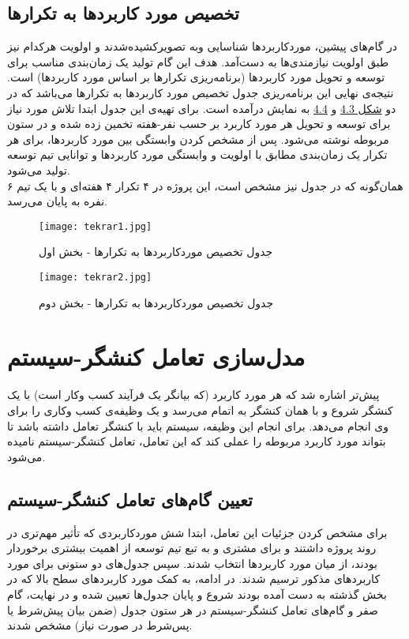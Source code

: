 \documentclass{report}
\begin{document}
\subsection{تخصیص مورد کاربردها به تکرارها}
در گام‌های پیشین، ﻣﻮردﮐﺎرﺑﺮدﻫﺎ ﺷﻨﺎﺳﺎﯾﯽ وﺑﻪ ﺗﺼﻮﯾﺮﻛﺸﯿﺪهﺷﺪند و اوﻟﻮﯾﺖ هرکدام نیز طبق اوﻟﻮﯾﺖ ﻧﯿﺎزﻣﻨﺪی‌ها ﺑﻪ دﺳﺖآﻣﺪ. هدف این گام تولید یک زمان‌بندی مناسب برای توسعه و تحویل مورد کاربردها (برنامه‌ریزی تکرارها بر اساس مورد کاربردها) است. نتیجه‌ی نهایی این برنامه‌ریزی جدول تخصیص مورد کاربردها به تکرارها می‌باشد که در دو 
 \hyperlink{three}{شکل 4.3}
و
 \hyperlink{four}{4.4}
 به نمایش درآمده است. برای تهیه‌ی این جدول ابتدا تلاش مورد نیاز برای توسعه و تحویل هر مورد کاربرد بر حسب نفر-هفته تخمین زده شده و در ستون مربوطه نوشته می‌شود. پس از مشخص کردن وابستگی بین مورد کاربردها، برای هر تکرار یک زمان‌بندی مطابق با اولویت و وابستگی مورد کاربردها و توانایی تیم توسعه تولید می‌شود.\\
همان‌گونه که در جدول نیز مشخص است، این پروژه در ۴ تکرار ۴ هفته‌ای و با یک تیم ۶ نفره به پایان می‌رسد.
\hypertarget{three}{
\begin{figure}[!h]
\texttt{[image: tekrar1.jpg]}
\caption{جدول تخصیص موردکاربردها به تکرارها - بخش اول}
\end{figure}}
\clearpage
\hypertarget{four}{
\begin{figure}[!h]
\texttt{[image: tekrar2.jpg]}
\caption{جدول تخصیص موردکاربردها به تکرارها - بخش دوم}
\end{figure}}
\section{مدل‌سازی تعامل کنشگر-سیستم}
پیش‌تر اشاره شد که هر مورد کاربرد (که بیانگر یک فرآیند کسب وکار است) با یک کنشگر شروع و با همان کنشگر به اتمام می‌رسد و یک وظیفه‌ی کسب وکاری را برای وی انجام می‌دهد. برای انجام این وظیفه، سیستم باید با کنشگر تعامل داشته باشد تا بتواند مورد کاربرد مربوطه را عملی کند که این تعامل،
 تعامل کنشگر-سیستم نامیده می‌شود.

\subsection{تعیین گام‌های تعامل کنشگر-سیستم}
 برای مشخص کردن جزئیات این تعامل، ابتدا شش 
  \hypertarget{ch4}{ موردکاربردی} 
 که تأثیر مهم‌تری در روند پروژه داشتند و برای مشتری و به تبع تیم توسعه از اهمیت بیشتری برخوردار بودند، از میان مورد کاربردها انتخاب شدند. سپس جدول‌های دو ستونی برای مورد کاربردهای مذکور ترسیم شدند. در ادامه، به کمک مورد کاربردهای سطح بالا که در بخش گذشته به دست آمده بودند شروع و پایان جدول‌ها تعیین شده و در نهایت، گام صفر و گام‌های تعامل کنشگر-سیستم در هر ستون‌ جدول (ضمن بیان پیش‌شرط یا پس‌شرط در صورت نیاز) مشخص شدند.
 
\end{document}

